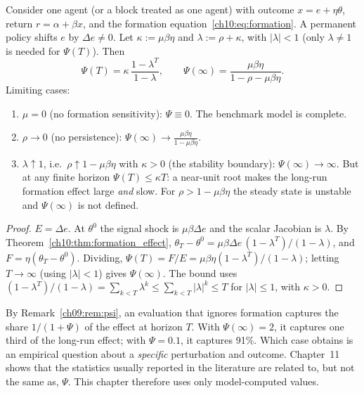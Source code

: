 \documentclass[../structural_economics_book.tex]{subfiles}
\begin{document}
\begin{proposition}\label{ch10:prop:psi_lq}
Consider one agent (or a block treated as one agent) with outcome $x = e + \eta\theta$, return $r = \alpha + \beta x$, and the formation equation~\eqref{ch10:eq:formation}. A permanent policy shifts $e$ by $\Delta e \neq 0$. Let $\kappa := \mu\beta\eta$ and $\lambda := \rho + \kappa$, with $|\lambda| < 1$ (only $\lambda \neq 1$ is needed for $\Psi(T)$). Then
\begin{equation}\label{ch10:eq:psi_formula}
\Psi(T) = \kappa\,\frac{1 - \lambda^T}{1 - \lambda}, \qquad \Psi(\infty) = \frac{\mu\beta\eta}{1 - \rho - \mu\beta\eta}.
\end{equation}
Limiting cases:
\begin{enumerate}
\item $\mu = 0$ (no formation sensitivity): $\Psi \equiv 0$. The benchmark model is complete.
\item $\rho \to 0$ (no persistence): $\Psi(\infty) \to \frac{\mu\beta\eta}{1 - \mu\beta\eta}$.
\item $\lambda \uparrow 1$, i.e.\ $\rho \uparrow 1 - \mu\beta\eta$ with $\kappa > 0$ (the stability boundary): $\Psi(\infty) \to \infty$. But at any finite horizon $\Psi(T) \le \kappa T$: a near-unit root makes the long-run formation effect large \textit{and} slow. For $\rho > 1 - \mu\beta\eta$ the steady state is unstable and $\Psi(\infty)$ is not defined.
\end{enumerate}
\end{proposition}

\begin{proof}
$E = \Delta e$. At $\theta^0$ the signal shock is $\mu\beta\Delta e$ and the scalar Jacobian is $\lambda$. By Theorem~\ref{ch10:thm:formation_effect}, $\theta_T - \theta^0 = \mu\beta\Delta e\,(1 - \lambda^T)/(1 - \lambda)$, and $F = \eta(\theta_T - \theta^0)$. Dividing, $\Psi(T) = F/E = \mu\beta\eta(1 - \lambda^T)/(1 - \lambda)$; letting $T \to \infty$ (using $|\lambda| < 1$) gives $\Psi(\infty)$. The bound uses $(1 - \lambda^T)/(1 - \lambda) = \sum_{k<T}\lambda^k \le \sum_{k<T}|\lambda|^k \le T$ for $|\lambda| \le 1$, with $\kappa > 0$.
\end{proof}

\begin{intuition}
By Remark~\ref{ch09:rem:psi}, an evaluation that ignores formation captures the share $1/(1+\Psi)$ of the effect at horizon $T$. With $\Psi(\infty) = 2$, it captures one third of the long-run effect; with $\Psi = 0.1$, it captures 91\%. Which case obtains is an empirical question about a \textit{specific} perturbation and outcome. Chapter~11 shows that the statistics usually reported in the literature are related to, but not the same as, $\Psi$. This chapter therefore uses only model-computed values.
\end{intuition}
\end{document}
